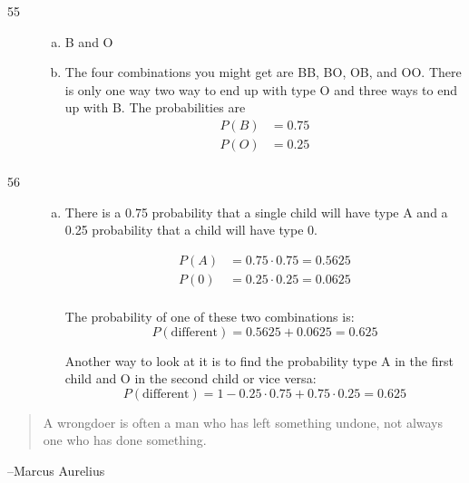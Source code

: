 \documentclass[letterpaper]{exam}
\begin{document}
\begin{description}
    \item[55]
      \begin{enumerate}[(a)]
        \item B and O

        \item
          The four combinations you might get are BB, BO, OB, and OO. There is
          only one way two way to end up with type O and three ways to end up
          with B. The probabilities are
          \begin{align*}
            P(B) & = 0.75 \\
            P(O) & = 0.25 \\
          \end{align*}
      \end{enumerate}

    \item[56]
      \begin{enumerate}[(a)]
        \item There is a 0.75 probability that a single child will have type A and a
          0.25 probability that a child will have type 0. 

          \begin{align*}
            P(A) &= 0.75 \cdot 0.75 = 0.5625 \\
            P(0) &= 0.25 \cdot 0.25 = 0.0625 \\
          \end{align*}

          The probability of one of these two combinations is:
          \[
            P(\text{different}) = 0.5625 + 0.0625 = \boxed{ 0.625 }
          \]

          Another way to look at it is to find the probability type A in the
          first child and O in the second child or vice versa:
          \[
            P(\text{different}) = 1 - 0.25 \cdot 0.75 + 0.75 \cdot 0.25 
              = \boxed{ 0.625 }
          \]
      \end{enumerate}
  \end{description}

  \else
    \vspace{11 cm}
    \begin{quote}
      \begin{em}
        A wrongdoer is often a man who has left something undone, not always one
        who has done something.
      \end{em}
    \end{quote}
    \hspace{1 cm}--Marcus Aurelius
  \fi
\end{document}
